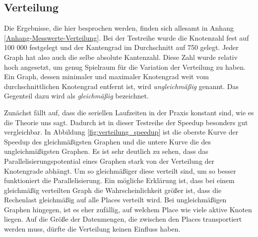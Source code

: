 \subsection{Verteilung} %
\label{sub:verteilung}
Die Ergebnisse, die hier besprochen werden, finden sich allesamt in Anhang \ref{Anhang-Messwerte-Verteilung}. Bei der Testreihe wurde die Knotenzahl fest auf 100 000 festgelegt und der Kantengrad im Durchschnitt auf 750 gelegt. Jeder Graph hat also auch die selbe absolute Kantenzahl. Diese Zahl wurde relativ hoch angesetzt, um genug Spielraum für die Variation der Verteilung zu haben. Ein Graph, dessen minimaler und maximaler Knotengrad weit vom durchschnittlichen Knotengrad entfernt ist, wird \textit{ungleichmäßig} genannt. Das Gegenteil dazu wird als \textit{gleichmäßig} bezeichnet. 

Zunächst fällt auf, dass die seriellen Laufzeiten in der Praxis konstant sind, wie es die Theorie uns sagt. Dadurch ist in dieser Testreihe der Speedup besonders gut vergleichbar. In Abbildung \ref{fig:verteilung_speedup} ist die oberste Kurve der Speedup des gleichmäßigsten Graphen und die untere Kurve die des ungleichmäßigsten Graphen. Es ist sehr deutlich zu sehen, dass das Parallelisierungspotential eines Graphen stark von der Verteilung der Knotengrade abhängt. Um so gleichmäßiger diese verteilt sind, um so besser funktioniert die Parallelisierung. Ein mögliche Erklärung ist, dass bei einem gleichmäßig verteilten Graph die Wahrscheinlichkeit größer ist, dass die Rechenlast gleichmäßig auf alle Places verteilt wird. Bei ungleichmäßigen Graphen hingegen, ist es eher zufällig, auf welchem Place wie viele aktive Knoten liegen. Auf die Größe der Datenmengen, die zwischen den Places transportiert werden muss, dürfte die Verteilung keinen Einfluss haben.

